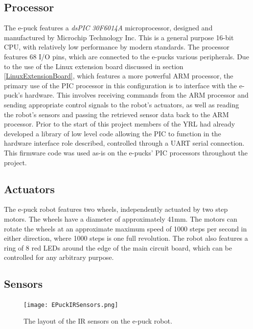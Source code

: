 \subsection{Processor}
The e-puck features a \textit{dsPIC 30F6014A} microprocessor, designed and manufactured by Microchip Technology Inc. This is a general purpose 16-bit CPU, with relatively low performance by modern standards. The processor features 68 I/O pins, which are connected to the e-pucks various peripherals. Due to the use of the Linux extension board discussed in section \ref{LinuxExtensionBoard}, which features a more powerful ARM processor, the primary use of the PIC processor in this configuration is to interface with the e-puck's hardware. This involves receiving commands from the ARM processor and sending appropriate control signals to the robot's actuators, as well as reading the robot's sensors and passing the retrieved sensor data back to the ARM processor. Prior to the start of this project members of the YRL had already developed a library of low level code allowing the PIC to function in the hardware interface role described, controlled through a UART serial connection. This firmware code was used as-is on the e-pucks' PIC processors throughout the project.


\subsection{Actuators}
The e-puck robot features two wheels, independently actuated by two step motors. The wheels have a diameter of approximately 41mm. The motors can rotate the wheels at an approximate maximum speed of 1000 steps per second in either direction, where 1000 steps is one full revolution. The robot also features a ring of 8 red LEDs around the edge of the main circuit board, which can be controlled for any arbitrary purpose. 


\subsection{Sensors}

\begin{figure}
	\begin{center}
	\texttt{[image: EPuckIRSensors.png]}
	\decoRule
	\caption[e-puck IR Sensor Layout]{The layout of the IR sensors on the e-puck robot.}
	\label{fig:EPuckIRSensors}
	\end{center}
\end{figure}

